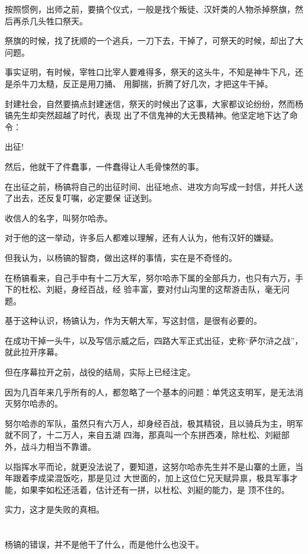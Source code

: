 \documentclass[11pt,a4paper,onecolumn]{article}
\begin{document}
按照惯例，出师之前，要搞个仪式，一般是找个叛徒、汉奸类的人物杀掉祭旗，然后再杀几头牲口祭天。

祭旗的时候，找了抚顺的一个逃兵，一刀下去，干掉了，可祭天的时候，却出了大问题。

事实证明，有时候，宰牲口比宰人要难得多，祭天的这头牛，不知是神牛下凡，还是杀牛刀太糙，反正是用刀捅、
用脚揣，折腾了好几次，才把这牛干掉。

封建社会，自然要搞点封建迷信，祭天的时候出了这事，大家都议论纷纷，然而杨镐先生却突然超越了时代，表现
出了不信鬼神的大无畏精神。他坚定地下达了命令：

出征!

然后，他就干了件蠢事，一件蠢得让人毛骨悚然的事。

在出征之前，杨镐将自己的出征时间、出征地点、进攻方向写成一封信，并托人送了出去，还反复叮嘱，必定要保
证送到。

收信人的名字，叫努尔哈赤。

对于他的这一举动，许多后人都难以理解，还有人认为，他有汉奸的嫌疑。

但我认为，以杨镐的智商，做出这样的事情，实在是不奇怪的。

在杨镐看来，自己手中有十二万大军，努尔哈赤下属的全部兵力，也只有六万，手下的杜松、刘綎，身经百战，经
验丰富，要对付山沟里的这帮游击队，毫无问题。

基于这种认识，杨镐认为，作为天朝大军，写这封信，是很有必要的。

在成功干掉一头牛，以及写信示威之后，四路大军正式出征，史称``萨尔浒之战''，就此拉开序幕。

但在序幕拉开之前，战役的结局，实际上已经注定。

因为几百年来几乎所有的人，都忽略了一个基本的问题：单凭这支明军，是无法消灭努尔哈赤的。

努尔哈赤的军队，虽然只有六万人，却身经百战，极其精锐，且以骑兵为主，明军就不同了，十二万人，来自五湖
四海，那真叫一个东拼西凑，除杜松、刘綎部外，战斗力相当不靠谱。

以指挥水平而论，就更没法说了，要知道，这努尔哈赤先生并不是山寨的土匪，当年跟着李成梁混饭吃，那是见过
大世面的，加上这位仁兄天赋异禀，极具军事才能，如果李如松还活着，估计还有一拼，以杜松、刘綎的能力，是
顶不住的。

实力，这才是失败的真相。

\section[\thesection]{}

杨镐的错误，并不是他干了什么，而是他什么也没干。
\end{document}
